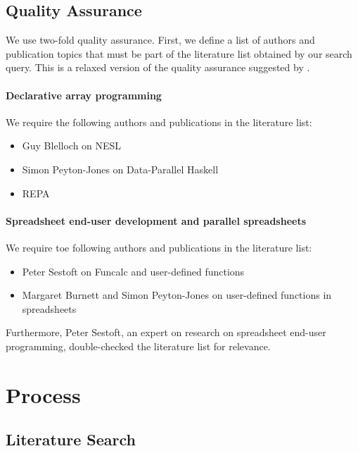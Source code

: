 \documentclass[a4paper]{article}
\begin{document}
\subsection{Quality Assurance}
\label{sec:quality-assurance}

We use two-fold quality assurance. First, we define a list of authors
and publication topics that must be part of the literature list
obtained by our search query. This is a relaxed version of the quality
assurance suggested by \citet{keele2007guidelines}.

\paragraph{Declarative array programming}

We require the following authors and publications in the literature
list:

\begin{itemize}
\item Guy Blelloch on NESL
\item Simon Peyton-Jones on Data-Parallel Haskell
\item REPA
\end{itemize}

\paragraph{Spreadsheet end-user development and parallel spreadsheets}

We require toe following authors and publications in the literature
list:

\begin{itemize}
\item Peter Sestoft on Funcalc and user-defined functions
\item Margaret Burnett and Simon Peyton-Jones on user-defined
  functions in spreadsheets
\end{itemize}

Furthermore, Peter Sestoft, an expert on research on spreadsheet
end-user programming, double-checked the literature list for
relevance.

\section{Process}
\label{sec:process}

\subsection{Literature Search}
\label{sec:literature-search}
\end{document}
